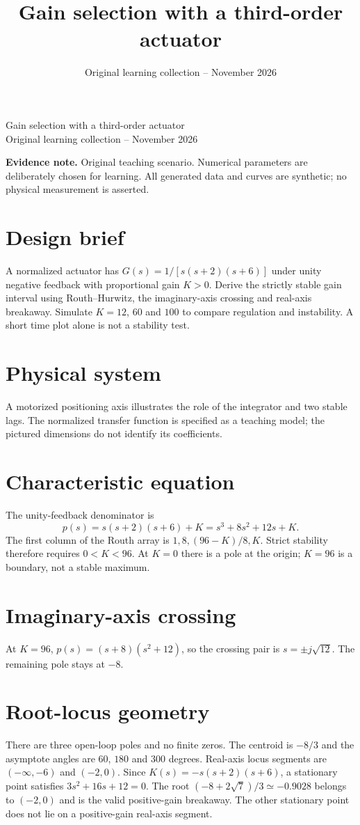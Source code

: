 \documentclass[10pt,a4paper]{article}
\title{\color{ink}Gain selection with a third-order actuator}
\author{}
\date{Original learning collection -- November 2026}
\begin{document}
\begin{center}{\LARGE\color{ink}Gain selection with a third-order actuator}\\[5pt]{\small Original learning collection -- November 2026}\end{center}

\textbf{Evidence note.} Original teaching scenario. Numerical parameters are deliberately chosen for learning. All generated data and curves are synthetic; no physical measurement is asserted.
\section{Design brief}
A normalized actuator has $G(s)=1/[s(s+2)(s+6)]$ under unity negative feedback with proportional gain $K>0$. Derive the strictly stable gain interval using Routh--Hurwitz, the imaginary-axis crossing and real-axis breakaway. Simulate $K=12$, $60$ and $100$ to compare regulation and instability. A short time plot alone is not a stability test.
\section{Physical system}
\begin{center}\resizebox{.88\linewidth}{!}{}\par{\small A motorized positioning axis illustrates the role of the integrator and two stable lags. The normalized transfer function is specified as a teaching model; the pictured dimensions do not identify its coefficients.}\end{center}
\section{Characteristic equation}
The unity-feedback denominator is
\[p(s)=s(s+2)(s+6)+K=s^3+8s^2+12s+K.\]
The first column of the Routh array is $1,8,(96-K)/8,K$. Strict stability therefore requires $0<K<96$. At $K=0$ there is a pole at the origin; $K=96$ is a boundary, not a stable maximum.
\section{Imaginary-axis crossing}
At $K=96$, $p(s)=(s+8)(s^2+12)$, so the crossing pair is $s=\pm j\sqrt{12}$. The remaining pole stays at $-8$.
\section{Root-locus geometry}
There are three open-loop poles and no finite zeros. The centroid is $-8/3$ and the asymptote angles are $60$, $180$ and $300$ degrees. Real-axis locus segments are $(-\infty,-6)$ and $(-2,0)$.
Since $K(s)=-s(s+2)(s+6)$, a stationary point satisfies $3s^2+16s+12=0$. The root $(-8+2\sqrt7)/3\simeq-0.9028$ belongs to $(-2,0)$ and is the valid positive-gain breakaway. The other stationary point does not lie on a positive-gain real-axis segment.
\end{document}
